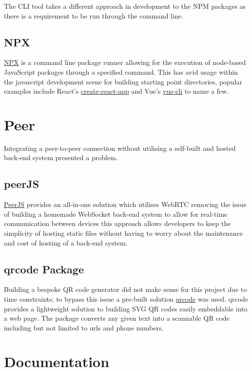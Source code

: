 \documentclass{l4proj}
\begin{document}
The CLI tool takes a different approach in development to the NPM packages as there is a requirement to be run through the command line.

\subsection{NPX }
\href{https://docs.npmjs.com/cli/v7/commands/npx}{NPX} is a command line package runner allowing for the execution of node-based JavaScript packages through a specified command. This has avid usage within the javascript development scene for building starting point directories, popular examples include React's \href{https://reactjs.org/docs/create-a-new-react-app.html}{create-react-app} and Vue's \href{https://cli.vuejs.org/}{vue-cli} to name a few.

\section{Peer}

Integrating a peer-to-peer connection without utilising a self-built and hosted back-end system presented a problem.

\subsection{peerJS}
\href{https://peerjs.com/}{PeerJS} provides an all-in-one solution which utilises WebRTC removing the issue of building a homemade WebSocket back-end system to allow for real-time communication between devices this approach allows developers to keep the simplicity of hosting static files without having to worry about the maintenance and cost of hosting of a back-end system.

\subsection{qrcode Package }
\text Building a bespoke QR code generator did not make sense for this project due to time constraints; to bypass this issue a pre-built solution \href{https://github.com/soldair/node-qrcode#readme}{qrcode} was used. qrcode provides a lightweight solution to building SVG QR codes easily embeddable into a web page. The package converts any given text into a scannable QR code including but not limited to urls and phone numbers. 

\section{Documentation }
\end{document}
